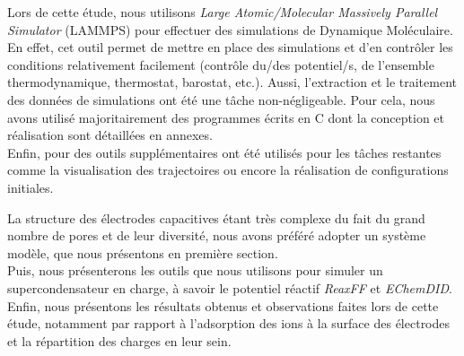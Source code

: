 Lors de cette étude, nous utilisons \emph{Large Atomic/Molecular Massively Parallel Simulator} (LAMMPS) pour effectuer des simulations de Dynamique Moléculaire. En effet, cet outil permet de mettre en place des simulations et d'en contrôler les conditions relativement facilement (contrôle du/des potentiel/s, de l'ensemble thermodynamique, thermostat, barostat, etc.).
Aussi, l'extraction et le traitement des données de simulations ont été une tâche non-négligeable. Pour cela, nous avons utilisé majoritairement des programmes écrits en C dont la conception et réalisation sont détaillées en annexes.\\
Enfin, pour des outils supplémentaires ont été utilisés pour les tâches restantes comme la visualisation des trajectoires\cite{ovito} ou encore la réalisation de configurations initiales\cite{martinez_packmol_2009}.

La structure des électrodes capacitives étant très complexe du fait du grand nombre de pores et de leur diversité, nous avons préféré adopter un système modèle, que nous présentons en première section.\\
Puis, nous présenterons les outils que nous utilisons pour simuler un supercondensateur en charge, à savoir le potentiel réactif \emph{ReaxFF}\cite{van_duin_reaxff_2001}\cite{russo_atomistic-scale_2011}\cite{senftle_reaxff_2016} et \emph{EChemDID}\cite{onofrio_voltage_2015}.\\
Enfin, nous présentons les résultats obtenus et observations faites lors de cette étude, notamment par rapport à l'adsorption des ions à la surface des électrodes et la répartition des charges en leur sein.
